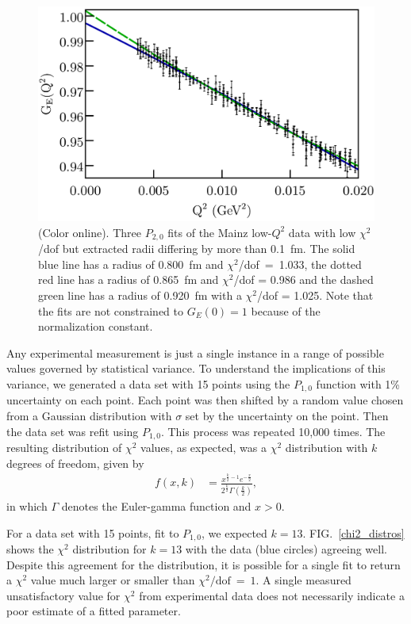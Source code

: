 \documentclass[aps,prd,twocolumn,groupedaddress,10pt]{revtex4-1}
\begin{document}
\begin{figure}[h!]
\includegraphics[scale=0.41]{varied_good_fits.pdf}
\caption{(Color online). Three $P_{2,0}$ fits of the Mainz low-$Q^2$ data with low $\chi^2$/dof but extracted radii differing by more than 0.1~fm. The solid blue line has a radius of 0.800~fm and $\chi^2$/dof~=~1.033, the dotted red line has a radius of 0.865~fm and $\chi^2$/dof = 0.986 and the dashed green line has a radius of 0.920~fm with a $\chi^2$/dof = 1.025. Note that the fits are not constrained to $G_E(0)=1$ because of the normalization constant.} 
\label{varied_good_fits}
\end{figure}

Any experimental measurement is just a single instance in a range of possible values governed by statistical variance. To understand the implications of this variance, we generated a data set with 15 points using the $P_{1,0}$ function with 1\% uncertainty on each point. Each point was then shifted by a random value chosen from a Gaussian distribution with $\sigma$ set by the uncertainty on the point. Then the data set was refit using $P_{1,0}$. This process was repeated 10,000 times. The resulting distribution of $\chi^2$ values, as expected, was a $\chi^2$ distribution with $k$ degrees of freedom, given by
\begin{align}
f(x,k) &= \frac{x^{\frac{k}{2}-1}e^{-\frac{x}{2}}}{2^{\frac{k}{2}}\Gamma\left( \frac{k}{2} \right)},
\end{align}
in which $\Gamma$ denotes the Euler-gamma function and $x > 0$.

For a data set with 15 points, fit to $P_{1,0}$, we expected $k=13$. FIG.~\ref{chi2_distros} shows the $\chi^2$ distribution for $k=13$ with the data (blue circles) agreeing well. Despite this agreement for the distribution, it is possible for a single fit to return a $\chi^2$ value much larger or smaller than $\chi^2/\text{dof}~=~1$. A single measured unsatisfactory value for $\chi^2$ from experimental data does not necessarily indicate a poor estimate of a fitted parameter.
\end{document}
